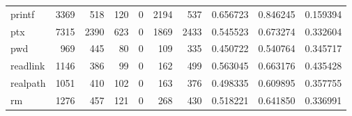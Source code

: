 \begin{tabular}{lrrrrrrrrr}
printf    &                                3369 &                                             518 &                                            120 &                                             0 &                                           2194 &                                          537 &                                           0.656723 &                               0.846245 &                             0.159394 \\
ptx       &                                7315 &                                            2390 &                                            623 &                                             0 &                                           1869 &                                         2433 &                                           0.545523 &                               0.673274 &                             0.332604 \\
pwd       &                                 969 &                                             445 &                                             80 &                                             0 &                                            109 &                                          335 &                                           0.450722 &                               0.540764 &                             0.345717 \\
readlink  &                                1146 &                                             386 &                                             99 &                                             0 &                                            162 &                                          499 &                                           0.563045 &                               0.663176 &                             0.435428 \\
realpath  &                                1051 &                                             410 &                                            102 &                                             0 &                                            163 &                                          376 &                                           0.498335 &                               0.609895 &                             0.357755 \\
rm        &                                1276 &                                             457 &                                            121 &                                             0 &                                            268 &                                          430 &                                           0.518221 &                               0.641850 &                             0.336991 \\

\end{tabular}
